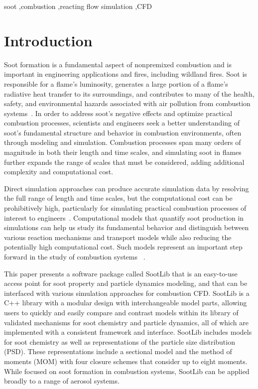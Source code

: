 \documentclass[preprint,letterpaper]{elsarticle}
\begin{document}
\begin{frontmatter}
\begin{keyword}
soot \sep combustion \sep reacting flow simulation \sep CFD
\end{keyword}

\end{frontmatter}

\linenumbers



\section{Introduction}
\label{s:intro}

Soot formation is a fundamental aspect of nonpremixed combustion and is important in engineering applications and fires, including wildland fires. Soot is responsible for a flame's luminosity, generates a large portion of a flame's radiative heat transfer to its surroundings, and contributes to many of the health, safety, and environmental hazards associated with air pollution from combustion systems~\cite{EPA_2009,EPA_2004}. In order to address soot's negative effects and optimize practical combustion processes, scientists and engineers seek a better understanding of soot's fundamental structure and behavior in combustion environments, often through modeling and simulation.
Combustion processes span many orders of magnitude in both their length and time scales, and simulating soot in flames further expands the range of scales that must be considered, adding additional complexity and computational cost.

Direct simulation approaches can produce accurate simulation data by resolving the full range of length and time scales, but the computational cost can be prohibitively high, particularly for simulating practical combustion processes of interest to engineers~\cite{Pope_2000}.
Computational models that quantify soot production in simulations can help us study its fundamental behavior and distinguish between various reaction mechanisms and transport models while also reducing the potentially high computational cost. Such models represent an important step forward in the study of combustion systems ~\cite{Frenklach_2002b}.

This paper presents a software package called SootLib that is an easy-to-use access point for soot property and particle dynamics modeling, and that can be interfaced with various simulation approaches for combustion CFD.
SootLib is a C++ library with a modular design with interchangeable model parts, allowing users to quickly and easily compare and contrast models within its library of validated mechanisms for soot chemistry and particle dynamics, all of which are implemented with a consistent framework and interface. 
SootLib includes models for soot chemistry as well as representations of the particle size distribution (PSD). These representations include a sectional model and the method of moments (MOM) with four closure schemes that consider up to eight moments. 
While focused on soot formation in combustion systems, SootLib can be applied broadly to a range of aerosol systems.
\end{document}
